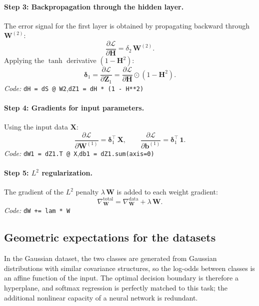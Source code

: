\documentclass[sigconf,screen,nonacm]{acmart}
\newcommand{\vone}{\mathbf{1}}
\newcommand{\vbone}{\mathbf{b}^{(1)}}
\newcommand{\mW}{\mathbf{W}}
\newcommand{\mWone}{\mathbf{W}^{(1)}}
\newcommand{\mWtwo}{\mathbf{W}^{(2)}}
\newcommand{\mX}{\mathbf{X}}
\newcommand{\mH}{\mathbf{H}}
\newcommand{\mZ}{\mathbf{Z}}
\newcommand{\loss}{\mathcal{L}}
\begin{document}
\paragraph{Step 3: Backpropagation through the hidden layer.}
The error signal for the first layer is obtained by propagating backward through $\mWtwo$:
\begin{equation}
\frac{\partial \loss}{\partial \mH} = {\delta}_{2}\,\mWtwo.
\end{equation}
Applying the $\tanh$ derivative $(1 - \mH^{2})$:
\begin{equation}
\boldsymbol{\delta}_{1} = \frac{\partial \loss}{\partial \mZ_{1}}
= \frac{\partial \loss}{\partial \mH} \odot (1 - \mH^{2}).
\end{equation}
\textit{Code:} \texttt{dH = dS @ W2},\quad \texttt{dZ1 = dH * (1 - H**2)}

\paragraph{Step 4: Gradients for input parameters.}
Using the input data $\mX$:
\begin{equation}
\frac{\partial \loss}{\partial \mWone} = \boldsymbol{\delta}_{1}^{\top}\,\mX,
\qquad
\frac{\partial \loss}{\partial \vbone} = \boldsymbol{\delta}_{1}^{\top}\,\vone.
\end{equation}
\textit{Code:} \texttt{dW1 = dZ1.T @ X},\quad \texttt{db1 = dZ1.sum(axis=0)}

\paragraph{Step 5: $L^{2}$ regularization.}
The gradient of the $L^{2}$ penalty $\lambda\,\mW$ is added to each weight gradient:
\begin{equation}
    \nabla_{\mW}^{\mathrm{total}} = \nabla_{\mW}^{\mathrm{data}} + \lambda\,\mW.
\end{equation}
\textit{Code:} \texttt{dW += lam * W}

\subsection{Geometric expectations for the datasets}
\label{sec:geometric}
In the Gaussian dataset, the two classes are generated from Gaussian distributions with similar covariance structures, so the log-odds between classes is an affine function of the input. The optimal decision boundary is therefore a hyperplane, and softmax regression is perfectly matched to this task; the additional nonlinear capacity of a neural network is redundant.
\end{document}

